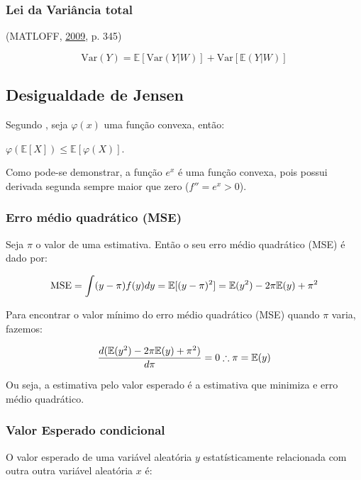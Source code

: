 \documentclass[a4paper, 12pt]{article}
\begin{document}
\subsubsection{Lei da Variância total}\label{lei-da-variancia-total}

(MATLOFF, \protect\hyperlink{ref-matloff2009}{2009}, p. 345)

\[\text{Var}(Y) = \mathbb{E}[\text{Var}(Y|W)] + \text{Var}[\mathbb{E}(Y|W)]\]

\subsection{Desigualdade de Jensen}\label{desigualdade-de-jensen}

Segundo , seja \(\varphi(x)\) uma função convexa, então:

\(\varphi \left(\mathbb{E} [X]\right)\leq \mathbb{E} \left[\varphi (X)\right].\)

Como pode-se demonstrar, a função \(e^x\) é uma função convexa, pois
possui derivada segunda sempre maior que zero (\({f}''=e^x>0\)).

\subsubsection{Erro médio quadrático
(MSE)}\label{erro-medio-quadratico-mse}

Seja \(\pi\) o valor de uma estimativa. Então o seu erro médio
quadrático (MSE) é dado por:

\[\text{MSE} = \int(y - \pi)f(y)dy\\
= \mathbb{E}[(y-\pi)^2]\\
= \mathbb{E}(y^2)-2\pi \mathbb{E}(y)+\pi^2\]

Para encontrar o valor mínimo do erro médio quadrático (MSE) quando
\(\pi\) varia, fazemos:

\[\frac{d(\mathbb{E}(y^2)-2\pi \mathbb{E}(y)+\pi^2)}{d\pi} = 0\\
\therefore \pi = \mathbb{E}(y)\]

Ou seja, a estimativa pelo valor esperado é a estimativa que minimiza e
erro médio quadrático.

\subsubsection{Valor Esperado
condicional}\label{valor-esperado-condicional}

O valor esperado de uma variável aleatória \(y\) estatísticamente
relacionada com outra outra variável aleatória \(x\) é:
\end{document}
